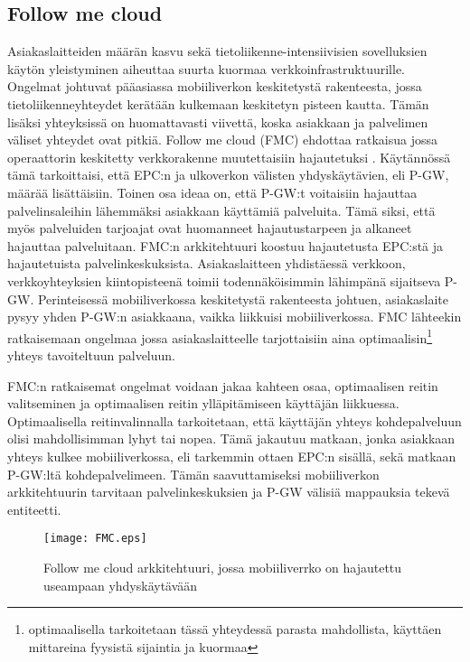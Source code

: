 \subsection{Follow me cloud} \label{fmc}

Asiakaslaitteiden määrän kasvu sekä tietoliikenne-intensiivisien sovelluksien käytön yleistyminen aiheuttaa suurta kuormaa verkkoinfrastruktuurille. Ongelmat johtuvat pääasiassa mobiiliverkon keskitetystä rakenteesta, jossa tietoliikenneyhteydet kerätään kulkemaan keskitetyn pisteen kautta. Tämän lisäksi yhteyksissä on huomattavasti viivettä, koska asiakkaan ja palvelimen väliset yhteydet ovat pitkiä. Follow me cloud (FMC) ehdottaa ratkaisua jossa operaattorin keskitetty verkkorakenne muutettaisiin hajautetuksi \cite{taleb2013follow}.
Käytännössä tämä tarkoittaisi, että EPC:n ja ulkoverkon välisten yhdyskäytävien, eli P-GW, määrää lisättäisiin. 
Toinen osa ideaa on, että P-GW:t voitaisiin hajauttaa palvelinsaleihin lähemmäksi asiakkaan käyttämiä palveluita. Tämä siksi, että myös palveluiden tarjoajat ovat huomanneet hajautustarpeen ja alkaneet hajauttaa palveluitaan. 
FMC:n arkkitehtuuri koostuu hajautetusta EPC:stä ja hajautetuista palvelinkeskuksista. Asiakaslaitteen yhdistäessä verkkoon, verkkoyhteyksien kiintopisteenä toimii todennäköisimmin lähimpänä sijaitseva P-GW. 
Perinteisessä mobiiliverkossa keskitetystä rakenteesta johtuen, asiakaslaite pysyy yhden P-GW:n asiakkaana, vaikka liikkuisi mobiiliverkossa.
FMC lähteekin ratkaisemaan ongelmaa jossa asiakaslaitteelle tarjottaisiin aina optimaalisin\footnote{optimaalisella tarkoitetaan tässä yhteydessä parasta mahdollista, käyttäen mittareina fyysistä sijaintia ja kuormaa} yhteys tavoiteltuun palveluun.

FMC:n ratkaisemat ongelmat voidaan jakaa kahteen osaa, optimaalisen reitin valitseminen ja optimaalisen reitin ylläpitämiseen käyttäjän liikkuessa. 
Optimaalisella reitinvalinnalla tarkoitetaan, että käyttäjän yhteys kohdepalveluun olisi mahdollisimman lyhyt tai nopea. Tämä jakautuu matkaan, jonka asiakkaan yhteys kulkee mobiiliverkossa, eli tarkemmin ottaen EPC:n sisällä, sekä matkaan P-GW:ltä kohdepalvelimeen. Tämän saavuttamiseksi mobiiliverkon arkkitehtuurin tarvitaan palvelinkeskuksien ja P-GW välisiä mappauksia tekevä entiteetti. 

\begin{figure}[tb]
\texttt{[image: FMC.eps]}
\caption{Follow me cloud arkkitehtuuri, jossa mobiiliverrko on hajautettu useampaan yhdyskäytävään} \label{fig:fmc}
\end{figure}

